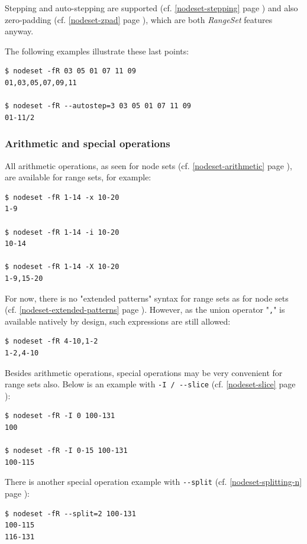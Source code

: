 \documentclass[english,a4paper]{csuserguide}
\begin{document}
Stepping and auto-stepping are supported (cf. \ref{nodeset-stepping} page \pageref{nodeset-stepping}) and also zero-padding (cf. \ref{nodeset-zpad} page \pageref{nodeset-zpad}), which are both \textit{RangeSet} features anyway.

The following examples illustrate these last points:
\medskip
\begin{lstlisting}[breaklines=true, breakatwhitespace=true]
$ nodeset -fR 03 05 01 07 11 09
01,03,05,07,09,11

$ nodeset -fR --autostep=3 03 05 01 07 11 09
01-11/2
\end{lstlisting}


\subsubsection{Arithmetic and special operations}
All arithmetic operations, as seen for node sets (cf. \ref{nodeset-arithmetic} page \pageref{nodeset-arithmetic}), are available for range sets, for example:
\medskip
\begin{lstlisting}[breaklines=true, breakatwhitespace=true]
$ nodeset -fR 1-14 -x 10-20
1-9

$ nodeset -fR 1-14 -i 10-20
10-14

$ nodeset -fR 1-14 -X 10-20
1-9,15-20
\end{lstlisting}

For now, there is no "extended patterns" syntax for range sets as for node sets (cf. \ref{nodeset-extended-patterns} page \pageref{nodeset-extended-patterns}). However, as the union operator "\verb+,+" is available natively by design, such expressions are still allowed:
\medskip
\begin{lstlisting}[breaklines=true, breakatwhitespace=true]
$ nodeset -fR 4-10,1-2
1-2,4-10
\end{lstlisting}

\pagebreak[2]

Besides arithmetic operations, special operations may be very convenient  for range sets also. Below is an example with \verb+-I / --slice+ (cf. \ref{nodeset-slice} page \pageref{nodeset-slice}):
\medskip
\begin{lstlisting}[breaklines=true, breakatwhitespace=true]
$ nodeset -fR -I 0 100-131
100

$ nodeset -fR -I 0-15 100-131
100-115
\end{lstlisting}

There is another special operation example with \verb+--split+ (cf. \ref{nodeset-splitting-n} page \pageref{nodeset-splitting-n}):
\medskip
\begin{lstlisting}[breaklines=true, breakatwhitespace=true]
$ nodeset -fR --split=2 100-131
100-115
116-131
\end{lstlisting}
\end{document}
